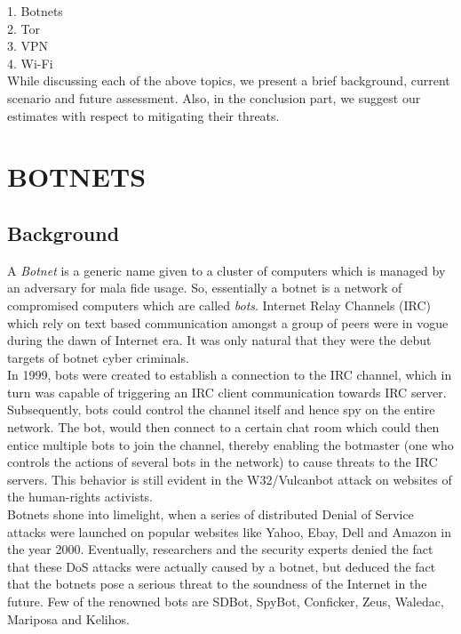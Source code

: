 \documentclass[letterpaper, 10 pt, conference]{ieeeconf}
\begin{document}
1. Botnets\\

2. Tor\\

3. VPN\\

4. Wi-Fi\\

While discussing each of the above topics, we present a brief background, current scenario and future assessment. Also, in the conclusion part, we suggest our estimates with respect to mitigating their threats.\\

\section{BOTNETS}

\subsection{Background}

A \textit{Botnet} is a generic name given to a cluster of computers which is managed by an adversary for mala fide usage. So, essentially a botnet is a network of compromised computers which are called \textit{bots}. Internet Relay Channels (IRC) which rely on text based communication amongst a group of peers were in vogue during the dawn of Internet era. It was only natural that they were the debut targets of botnet cyber criminals.\\

In 1999, bots were created to establish a connection to the IRC channel, which in turn was capable of triggering an IRC client communication towards IRC server. Subsequently, bots could control the channel itself and hence spy on the entire network. The bot, would then connect to a certain chat room which could  then entice multiple bots to join the channel, thereby enabling the botmaster (one who controls the actions of several bots in the network) to cause threats to the IRC servers. This behavior is still evident in the W32/Vulcanbot attack on websites of the human-rights activists.\\

Botnets shone into limelight, when a series of distributed Denial of Service attacks were launched on popular websites like Yahoo, Ebay, Dell and Amazon in the year 2000. Eventually, researchers and the security experts denied the fact that these DoS attacks were actually caused by a botnet, but deduced the fact that the botnets pose a serious threat to the soundness of the Internet in the future. Few of the renowned bots are SDBot, SpyBot, Conficker, Zeus, Waledac, Mariposa and Kelihos.\\
\end{document}
